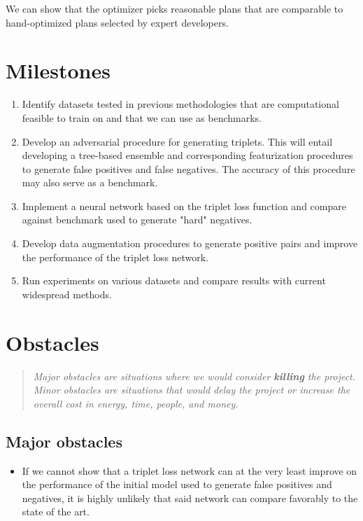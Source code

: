 \documentclass{proc}
\begin{document}
We can show that the optimizer picks reasonable plans that are comparable to hand-optimized plans selected by expert developers.

\section{Milestones}

\begin{enumerate}
  \item Identify datasets tested in previous methodologies that are computational feasible to train on and that we can use as benchmarks.
  \item Develop an adversarial procedure for generating triplets. This will entail developing a tree-based ensemble and corresponding featurization procedures to generate false positives and false negatives. The accuracy of this procedure may also serve as a benchmark.
  \item Implement a neural network based on the triplet loss function and compare against benchmark used to generate "hard" negatives.
  \item Develop data augmentation procedures to generate positive pairs and  improve the performance of the triplet loss network.
  \item Run experiments on various datasets and compare results with current widespread methods.
\end{enumerate}

\section{Obstacles}
\begin{quote}
\emph{Major obstacles are situations where we would consider \textbf{killing} the project. 
Minor obstacles are situations that would delay the project or increase the overall cost in energy, time, people, and money.}
\end{quote}

\subsection{Major obstacles} 

\begin{itemize}
  \item If we cannot show that a triplet loss network can at the very least improve on the performance of the initial model used to generate false positives and negatives, it is highly unlikely that said network can compare favorably to the state of the art.
\end{itemize}
\end{document}
